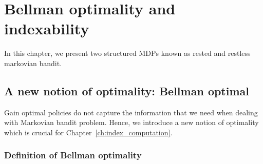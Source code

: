 \begingroup

\let\clearpage\relax

\chapter{Bellman optimality and indexability}
\label{ch:mbp}

In this chapter, we present two structured MDPs known as rested and restless markovian bandit.

\section{A new notion of optimality: Bellman optimal}
\label{ch:mbp:sec:bell}

Gain optimal policies do not capture the information that we need when dealing with Markovian bandit problem.
Hence, we introduce a new notion of optimality which is crucial for Chapter~\ref{ch:index_computation}.

\subsection{Definition of Bellman optimality}

